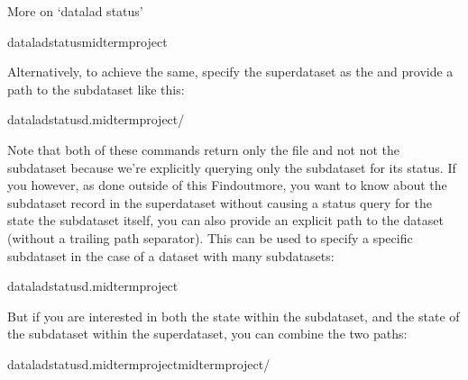 \begin{findoutmore}[label={fom-status}, before title={\thetcbcounter\ }, float, check odd page=true]{More on ‘datalad status’}
\begin{sphinxVerbatim}[commandchars=\\\{\}]
dataladstatusmidterm\PYGZus{}project
\end{sphinxVerbatim}

\sphinxAtStartPar
Alternatively, to achieve the same, specify the superdataset as the 
and provide a path to the subdataset  like
this:

\begin{sphinxVerbatim}[commandchars=\\\{\}]
dataladstatus\PYGZhy{}d.midterm\PYGZus{}project/
\end{sphinxVerbatim}

\sphinxAtStartPar
Note that both of these commands return only the  file and not
not the  subdataset because we’re explicitly querying only the
subdataset for its status.
If you however, as done outside of this Find\sphinxhyphen{}out\sphinxhyphen{}more, you want to know about
the subdataset record in the superdataset without causing a status query for
the state  the subdataset itself, you can also provide an explicit
path to the dataset (without a trailing path separator). This can be used
to specify a specific subdataset in the case of a dataset with many subdatasets:

\begin{sphinxVerbatim}[commandchars=\\\{\}]
dataladstatus\PYGZhy{}d.midterm\PYGZus{}project
\end{sphinxVerbatim}

\sphinxAtStartPar
But if you are interested in both the state within the subdataset, and
the state of the subdataset within the superdataset, you can combine the
two paths:

\begin{sphinxVerbatim}[commandchars=\\\{\}]
dataladstatus\PYGZhy{}d.midterm\PYGZus{}projectmidterm\PYGZus{}project/
\end{sphinxVerbatim}


\end{findoutmore}

